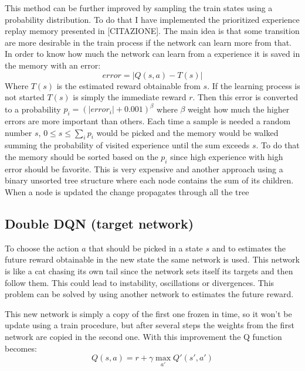 \documentclass[10pt]{article}
\begin{document}
\begin{multicols}{2}
This method can be further improved by sampling the train states using a probability distribution. To do that I have implemented the prioritized experience replay memory presented in [CITAZIONE]. The main idea is that some transition are more desirable in the train process if the network can learn more from that. In order to know how much the network can learn from a experience it is saved in the memory with an error:
\[
error = |Q(s,a) - T(s)|
\]
Where $T(s)$ is the estimated reward obtainable from $s$. If the learning process is not started $T(s)$ is simply the immediate reward $r$. Then this error is converted to a probability $p_i= (|error_i|+0.001)^\beta$ where $\beta$ weight how much the higher errors are more important than others. Each time a sample is needed a random number $s$, $0\le s \le \sum_i p_i$ would be picked and the memory would be walked summing the probability of visited experience until the sum exceeds $s$. To do that the memory should be sorted based on the $p_i$ since high experience with high error should be favorite. This is very expensive and another approach using a binary unsorted tree structure where each node contains the sum of its children. When a node is updated the change propagates through all the tree 

\subsection{Double DQN (target network)}
To choose the action $a$ that should be picked in a state $s$ and to estimates the future reward obtainable in the new state the same network is used. This network is like a cat chasing its own tail since the network sets itself its targets and then follow them. This could lead to instability, oscillations or divergences. This problem can be solved by using another network to estimates the future reward. 

This new network is simply a copy of the first one frozen in time, so it won't be update using a train procedure, but after several steps the weights from the first network are copied in the second one. With this improvement the Q function becomes: 
\[
Q(s, a) = r + \gamma \max_{a'} Q'(s', a') 
\]


\end{multicols}
\end{document}
